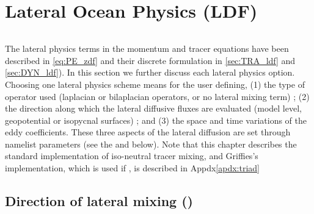 \documentclass[../tex_main/NEMO_manual]{subfiles}
\begin{document}
\chapter{Lateral Ocean Physics (LDF)}
\label{chap:LDF}
\minitoc


\newpage
$\ $\newline    %


The lateral physics terms in the momentum and tracer equations have been 
described in \autoref{eq:PE_zdf} and their discrete formulation in \autoref{sec:TRA_ldf} 
and \autoref{sec:DYN_ldf}). In this section we further discuss each lateral physics option. 
Choosing one lateral physics scheme means for the user defining, 
(1) the type of operator used (laplacian or bilaplacian operators, or no lateral mixing term) ; 
(2) the direction along which the lateral diffusive fluxes are evaluated (model level, geopotential or isopycnal surfaces) ; and 
(3) the space and time variations of the eddy coefficients. 
These three aspects of the lateral diffusion are set through namelist parameters 
(see the \textit{} and \textit{} below). 
Note that this chapter describes the standard implementation of iso-neutral
tracer mixing, and Griffies's implementation, which is used if
, is described in Appdx\autoref{apdx:triad}



\section{Direction of lateral mixing (\protect{})}
\label{sec:LDF_slp}

\end{document}
